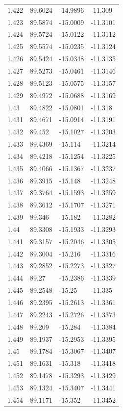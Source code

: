 \begin{tabular}{llll}
1.422 & 89.6024 & -14.9896 & -11.309 \\
1.423 & 89.5874 & -15.0009 & -11.3101 \\
1.424 & 89.5724 & -15.0122 & -11.3112 \\
1.425 & 89.5574 & -15.0235 & -11.3124 \\
1.426 & 89.5424 & -15.0348 & -11.3135 \\
1.427 & 89.5273 & -15.0461 & -11.3146 \\
1.428 & 89.5123 & -15.0575 & -11.3157 \\
1.429 & 89.4972 & -15.0688 & -11.3169 \\
1.43 & 89.4822 & -15.0801 & -11.318 \\
1.431 & 89.4671 & -15.0914 & -11.3191 \\
1.432 & 89.452 & -15.1027 & -11.3203 \\
1.433 & 89.4369 & -15.114 & -11.3214 \\
1.434 & 89.4218 & -15.1254 & -11.3225 \\
1.435 & 89.4066 & -15.1367 & -11.3237 \\
1.436 & 89.3915 & -15.148 & -11.3248 \\
1.437 & 89.3764 & -15.1593 & -11.3259 \\
1.438 & 89.3612 & -15.1707 & -11.3271 \\
1.439 & 89.346 & -15.182 & -11.3282 \\
1.44 & 89.3308 & -15.1933 & -11.3293 \\
1.441 & 89.3157 & -15.2046 & -11.3305 \\
1.442 & 89.3004 & -15.216 & -11.3316 \\
1.443 & 89.2852 & -15.2273 & -11.3327 \\
1.444 & 89.27 & -15.2386 & -11.3339 \\
1.445 & 89.2548 & -15.25 & -11.335 \\
1.446 & 89.2395 & -15.2613 & -11.3361 \\
1.447 & 89.2243 & -15.2726 & -11.3373 \\
1.448 & 89.209 & -15.284 & -11.3384 \\
1.449 & 89.1937 & -15.2953 & -11.3395 \\
1.45 & 89.1784 & -15.3067 & -11.3407 \\
1.451 & 89.1631 & -15.318 & -11.3418 \\
1.452 & 89.1478 & -15.3293 & -11.3429 \\
1.453 & 89.1324 & -15.3407 & -11.3441 \\
1.454 & 89.1171 & -15.352 & -11.3452 \\

\end{tabular}
